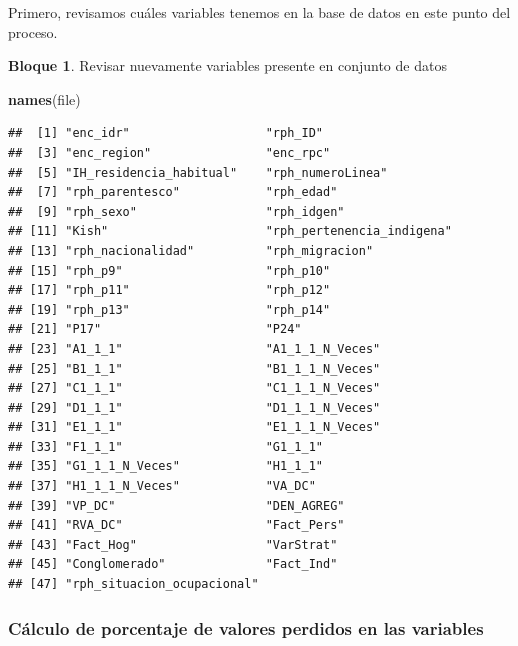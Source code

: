 \documentclass[]{book}
\newenvironment{Shaded}{\begin{snugshade}}{\end{snugshade}}
\newcommand{\KeywordTok}[1]{\textcolor[rgb]{0.13,0.29,0.53}{\textbf{#1}}}
\newcommand{\NormalTok}[1]{#1}
\theoremstyle{definition}
\theoremstyle{definition}
\newtheorem{example}{Bloque}[chapter]
\theoremstyle{definition}
\theoremstyle{definition}
\theoremstyle{remark}
\begin{document}
Primero, revisamos cuáles variables tenemos en la base de datos en este punto del proceso.

\begin{example}
\protect\hypertarget{exm:bloque34nbm}{}{\label{exm:bloque34nbm} }Revisar nuevamente variables presente en conjunto de datos
\end{example}

\begin{Shaded}
\begin{Highlighting}[]
\KeywordTok{names}\NormalTok{(file)}
\end{Highlighting}
\end{Shaded}

\begin{verbatim}
##  [1] "enc_idr"                   "rph_ID"                   
##  [3] "enc_region"                "enc_rpc"                  
##  [5] "IH_residencia_habitual"    "rph_numeroLinea"          
##  [7] "rph_parentesco"            "rph_edad"                 
##  [9] "rph_sexo"                  "rph_idgen"                
## [11] "Kish"                      "rph_pertenencia_indigena" 
## [13] "rph_nacionalidad"          "rph_migracion"            
## [15] "rph_p9"                    "rph_p10"                  
## [17] "rph_p11"                   "rph_p12"                  
## [19] "rph_p13"                   "rph_p14"                  
## [21] "P17"                       "P24"                      
## [23] "A1_1_1"                    "A1_1_1_N_Veces"           
## [25] "B1_1_1"                    "B1_1_1_N_Veces"           
## [27] "C1_1_1"                    "C1_1_1_N_Veces"           
## [29] "D1_1_1"                    "D1_1_1_N_Veces"           
## [31] "E1_1_1"                    "E1_1_1_N_Veces"           
## [33] "F1_1_1"                    "G1_1_1"                   
## [35] "G1_1_1_N_Veces"            "H1_1_1"                   
## [37] "H1_1_1_N_Veces"            "VA_DC"                    
## [39] "VP_DC"                     "DEN_AGREG"                
## [41] "RVA_DC"                    "Fact_Pers"                
## [43] "Fact_Hog"                  "VarStrat"                 
## [45] "Conglomerado"              "Fact_Ind"                 
## [47] "rph_situacion_ocupacional"
\end{verbatim}

\hypertarget{cuxe1lculo-de-porcentaje-de-valores-perdidos-en-las-variables}{%
\subsubsection{Cálculo de porcentaje de valores perdidos en las variables}\label{cuxe1lculo-de-porcentaje-de-valores-perdidos-en-las-variables}}
\end{document}
